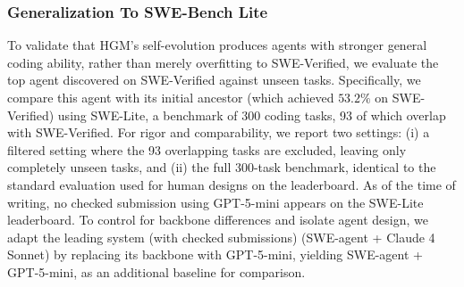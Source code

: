 \documentclass{article}
\begin{document}
\subsubsection{Generalization To SWE-Bench Lite} \label{exp:vs-human-lite}
To validate that HGM’s self-evolution produces agents with stronger general coding ability, rather than merely overfitting to SWE-Verified, we evaluate the top agent discovered on SWE-Verified against unseen tasks. Specifically, we compare this agent with its initial ancestor (which achieved $53.2\%$ on SWE-Verified) using SWE-Lite, a benchmark of 300 coding tasks, 93 of which overlap with SWE-Verified. For rigor and comparability, we report two settings: (i) a filtered setting where the 93 overlapping tasks are excluded, leaving only completely unseen tasks, and (ii) the full 300-task benchmark, identical to the standard evaluation used for human designs on the leaderboard. As of the time of writing, no checked submission using GPT-5-mini appears on the SWE-Lite leaderboard. To control for backbone differences and isolate agent design, we adapt the leading system (with checked submissions) (SWE-agent + Claude 4 Sonnet) by replacing its backbone with GPT-5-mini, yielding SWE-agent + GPT-5-mini, as an additional baseline for comparison.

\begin{table}[t!]
  \centering
  \label{tab:vs-human-lite}
  \renewcommand\arraystretch{1.2}
\end{table}
\end{document}
